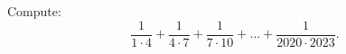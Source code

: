 Compute: \[\dfrac{1}{1\cdot4}+\dfrac{1}{4\cdot7}+\dfrac{1}{7\cdot10}+\ldots+\dfrac{1}{2020\cdot2023}.\]
